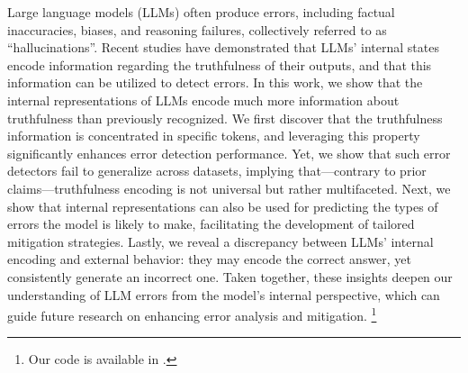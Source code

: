 Large language models (LLMs) often produce errors, including factual inaccuracies, biases, and reasoning failures, collectively referred to as ``hallucinations''.
Recent studies have demonstrated that LLMs' internal states encode information regarding the truthfulness of their outputs, and that this information can be utilized to detect errors.
In this work, we show that the internal representations of LLMs encode much more information about truthfulness than previously recognized.
We first discover that the truthfulness information is concentrated in specific tokens, and leveraging this property significantly enhances error detection performance.
Yet, we show that such error detectors fail to generalize across datasets, implying that---contrary to prior claims---truthfulness encoding is not universal but rather multifaceted.
Next, we show that internal representations can also be used for predicting the types of errors the model is likely to make, facilitating the development of tailored mitigation strategies.
Lastly, we reveal a discrepancy between LLMs' internal encoding and external behavior: they may encode the correct answer, yet consistently generate an incorrect one.
Taken together, these insights deepen our understanding of LLM errors from the model's internal perspective, which can guide future research on enhancing error analysis and mitigation.%
\footnote{Our code is available in \repo.}
